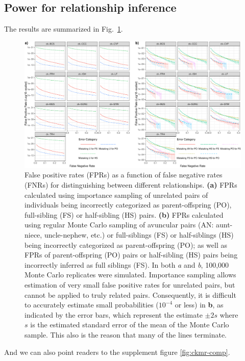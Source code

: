 \subsection*{Power for relationship inference}

The results are summarized in Fig.~\ref{fig:fprs}.
\begin{figure}
\newcommand{\fprcap}{\footnotesize False positive rates (FPRs) as a function of false negative
rates (FNRs) for distinguishing between different relationships.  {\bf (a)} FPRs calculated
using importance sampling of unrelated pairs of individuals being incorrectly categorized as parent-offspring (PO),
full-sibling (FS) or half-sibling (HS) pairs.  {\bf (b)}  FPRs calculated using regular Monte Carlo
sampling of avuncular pairs (AN: aunt-niece, uncle-nephew, etc.) or full-siblings (FS) or half-siblings (HS) being 
incorrectly categorized as parent-offspring (PO); as well as FPRs of parent-offspring (PO) pairs or half-sibling (HS) 
pairs being incorrectly inferred as full siblings (FS).  In both {\em a} and {\em b}, 100,000 Monte Carlo replicates 
were simulated.  Importance sampling allows estimation of very small false positive rates for unrelated pairs, but 
cannot be applied to truly related pairs.  Consequently, it is difficult to accurately estimate small probabilities 
($10^{-4}$ or less) in {\bf b}, as indicated by the error bars, which represent the estimate $\pm 2s$ where $s$ is the estimated standard error of the mean of the Monte Carlo sample.  This also is the reason that many of the lines terminate.   }
\begin{center}
\includegraphics[width=\textwidth]{images/fpr-fnr-figure-crop.pdf}
\end{center}
\caption[\fprcap]{\fprcap}
\label{fig:fprs}
\end{figure}
And we can also point readers to the supplement figure \ref{fig:ckmr-comp}.




